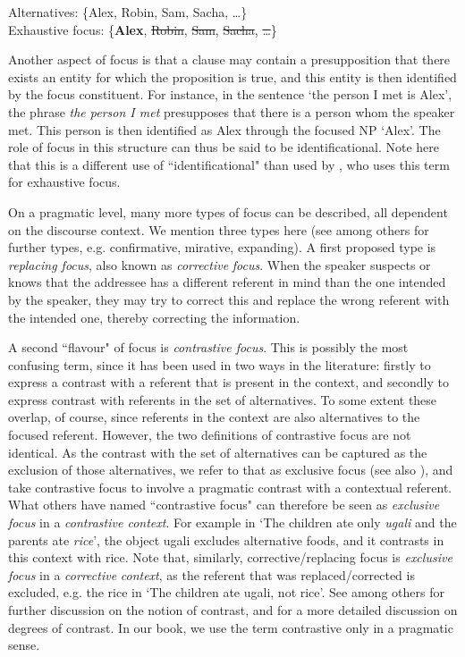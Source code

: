 \documentclass[output=paper]{langscibook}
\begin{document}
\ea
\gll
{Alternatives:}   {\{Alex, Robin, Sam, Sacha, …\}}\\
{Exhaustive focus:}  {\{\textbf{Alex}, \sout{Robin}, \sout{Sam}, \sout{Sacha}, \sout{…}\}}\\
\z

Another aspect of focus is that a clause may contain a presupposition that there exists an entity for which the proposition is true, and this entity is then identified by the focus constituent. For instance, in the sentence ‘the person I met is Alex’, the phrase \textit{the person I met} presupposes that there is a person whom the speaker met. This person is then identified as Alex through the focused NP ‘Alex’. The role of focus in this structure can thus be said to be identificational. Note here that this is a different use of ``identificational" than used by \citet{É.Kiss1998}, who uses this term for exhaustive focus.

On a pragmatic level, many more types of focus can be described, all dependent on the discourse context. We mention three types here (see \citealt[]{Cruschina2021,Dik1997,Krifka2008} among others for further types, e.g. confirmative, mirative, expanding). A first proposed type is \textit{replacing focus}, also known as \textit{corrective} \textit{focus}. When the speaker suspects or knows that the addressee has a different referent in mind than the one intended by the speaker, they may try to correct this and replace the wrong referent with the intended one, thereby correcting the information.

A second ``flavour" of focus is \textit{contrastive focus}. This is possibly the most confusing term, since it has been used in two ways in the literature: firstly to express a contrast with a referent that is present in the context, and secondly to express contrast with referents in the set of alternatives. To some extent these overlap, of course, since referents in the context are also alternatives to the focused referent. However, the two definitions of contrastive focus are not identical. As the contrast with the set of alternatives can be captured as the exclusion of those alternatives, we refer to that as exclusive focus (see also \citealt{ByramWashburn2013}), and take contrastive focus to involve a pragmatic contrast with a contextual referent. What others have named ``contrastive focus" can therefore be seen as \textit{exclusive focus} in a \textit{contrastive context}. For example in ‘The children ate only \textit{ugali} and the parents ate \textit{rice}’, the object ugali excludes alternative foods, and it contrasts in this context with rice. Note that, similarly, corrective/replacing focus is \textit{exclusive} \textit{focus} in a \textit{corrective} \textit{context}, as the referent that was replaced/corrected is excluded, e.g. the rice in ‘The children ate ugali, not rice’. See \citet{Repp2010,Molnár2002} among others for further discussion on the notion of contrast, and \citet{Cruschina2021} for a more detailed discussion on degrees of contrast. In our book, we use the term contrastive only in a pragmatic sense.
\end{document}
